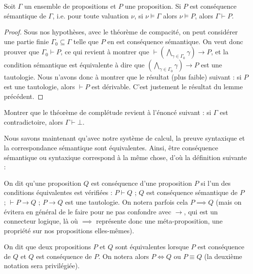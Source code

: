 \begin{them}
    Soit $\Gamma$ un ensemble de propositions et $P$ une proposition. Si $P$ est conséquence sémantique de $\Gamma$, i.e. pour toute valuation $\nu$, si $\nu\models\Gamma$ alors $\nu\models P$, alors $\Gamma\vdash P$.
\end{them}

\begin{proof}
    Sous nos hypothèses, avec le théorème de compacité, on peut considérer une partie finie $\Gamma_0\subseteq\Gamma$ telle que $P$ en est conséquence sémantique. On veut donc prouver que $\Gamma_0\vdash P$, ce qui revient à montrer que $\vdash \left(\displaystyle{\bigwedge_{\gamma\in\Gamma_0}}\gamma \right)\to P$, et la condition sémantique est équivalente à dire que $\left(\displaystyle{\bigwedge_{\gamma\in\Gamma_0}}\gamma \right)\to P$ est une tautologie. Nous n'avons donc à montrer que le résultat (plus faible) suivant : si $P$ est une tautologie, alors $\vdash P$ est dérivable. C'est justement le résultat du lemme précédent.
\end{proof}

\begin{exo}
    Montrer que le théorème de complétude revient à l'énoncé suivant : si $\Gamma$ est contradictoire, alors $\Gamma\vdash \bot$.
\end{exo}

Nous savons maintenant qu'avec notre système de calcul, la preuve syntaxique et la correspondance sémantique sont équivalentes. Ainsi, être conséquence sémantique ou syntaxique correspond à la même chose, d'où la  définition suivante :

\begin{defi}
    On dit qu'une proposition $Q$ est conséquence d'une proposition $P$ si l'un des conditions équivalentes est vérifiées : $P\vdash Q$ ; $Q$ est conséquence sémantique de $P$ ; $\vdash P \to Q$ ; $P\to Q$ est une tautologie. On notera parfois cela $P\implies Q$ (mais on évitera en général de le faire pour ne pas confondre avec $\to$, qui est un connecteur logique, là où $\implies$ représente donc une méta-proposition, une propriété sur nos propositions elles-mêmes).

    On dit que deux propositions $P$ et $Q$ sont équivalentes lorsque $P$ est conséquence de $Q$ et $Q$ est conséquence de $P$. On notera alors $P\iff Q$ ou $P\equiv Q$ (la deuxième notation sera privilégiée).
\end{defi}

